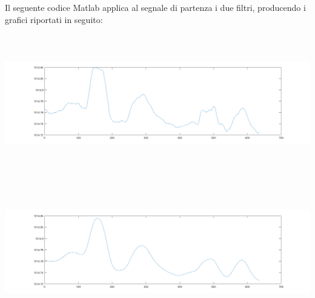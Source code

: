 \documentclass[a4paper, oneside]{book}
\begin{document}
Il seguente codice Matlab applica al segnale di partenza i due filtri, producendo i grafici riportati in seguito: \\

\makebox[\linewidth]{}
\makebox[\linewidth]{}
\begin{minipage}{\linewidth}
\begin{center}
\includegraphics[width=160mm, height= 60mm]{./images/segnali/pressure_phone_movmean.png} 
\end{center}
\end{minipage}
\makebox[\linewidth]{}
\makebox[\linewidth]{}
\makebox[\linewidth]{}
\makebox[\linewidth]{}
\begin{minipage}{\linewidth}
\begin{center}
\includegraphics[width=160mm, height= 60mm]{./images/segnali/pressure_phone_gauss.png} 
\end{center}
\end{minipage}



\clearpage

\end{document}
